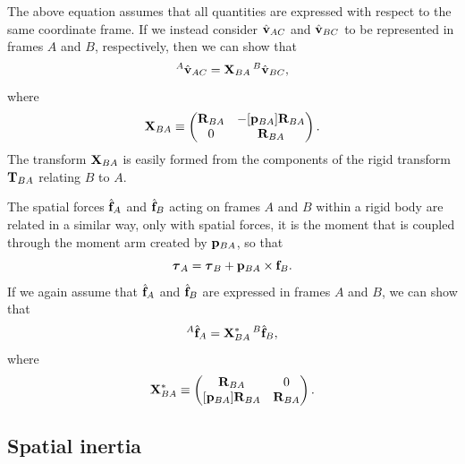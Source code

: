 The above equation assumes that all quantities are expressed
with respect to the same coordinate frame.
If we instead consider $\hat{{\bf v}}_{AC}$ and $\hat{{\bf v}}_{BC}$ to be represented
in frames $A$ and $B$, respectively, then
we can show that
%
\begin{equation}
{}^A\hat{{\bf v}}_{AC} = {\bf X}_{BA} \, {}^B\hat{{\bf v}}_{BC},
\end{equation}
%
where
%
\begin{equation}
{\bf X}_{BA} \equiv
\left(\begin{matrix} {\bf R}_{BA} & -[{\bf p}_{BA}] {\bf R}_{BA} \\ 0 & {\bf R}_{BA} \end{matrix}\right).
\label{XvelAB:eqn}
\end{equation}
%
The transform ${\bf X}_{BA}$ is easily formed from the components of the
rigid transform ${\bf T}_{BA}$ relating $B$ to $A$.

The spatial forces $\hat{{\bf f}}_A$ and $\hat{{\bf f}}_B$ acting on frames $A$ and
$B$ within a rigid body are related in a similar way, only with
spatial forces, it is the moment that is coupled through the moment
arm created by ${\bf p}_{BA}$, so that
%
\begin{equation*}
\boldsymbol\tau_{A} = \boldsymbol\tau_{B} + {\bf p}_{BA} \times {\bf f}_{B}.
\end{equation*}
%
If we again assume that $\hat{{\bf f}}_A$ and $\hat{{\bf f}}_B$
are expressed in frames $A$ and $B$, we can show that
%
\begin{equation}
{}^A\hat{{\bf f}}_A = {\bf X}^*_{BA} \, {}^B\hat{{\bf f}}_B,
\end{equation}
%
where
%
\begin{equation}
\X^*_{BA} \equiv
\matl \R_{BA} & 0 \\  [\p_{BA}] \R_{BA} & \R_{BA} \matr.
\label{XforceAB:eqn}
\end{equation}
%

\subsection{Spatial inertia}
\label{SpatialInertia:sec}

